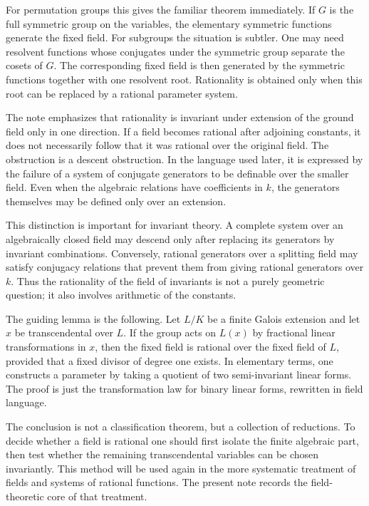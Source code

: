 \documentclass[11pt]{article}
\begin{document}
For permutation groups this gives the familiar theorem immediately. If \(G\) is the full symmetric
group on the variables, the elementary symmetric functions generate the fixed field. For subgroups
the situation is subtler. One may need resolvent functions whose conjugates under the symmetric
group separate the cosets of \(G\). The corresponding fixed field is then generated by the symmetric
functions together with one resolvent root. Rationality is obtained only when this root can be
replaced by a rational parameter system.


The note emphasizes that rationality is invariant under extension of the ground field only in one
direction. If a field becomes rational after adjoining constants, it does not necessarily follow
that it was rational over the original field. The obstruction is a descent obstruction. In the
language used later, it is expressed by the failure of a system of conjugate generators to be
definable over the smaller field. Even when the algebraic relations have coefficients in \(k\), the
generators themselves may be defined only over an extension.


This distinction is important for invariant theory. A complete system over an algebraically closed
field may descend only after replacing its generators by invariant combinations. Conversely,
rational generators over a splitting field may satisfy conjugacy relations that prevent them from
giving rational generators over \(k\). Thus the rationality of the field of invariants is not a
purely geometric question; it also involves arithmetic of the constants.


The guiding lemma is the following. Let \(L/K\) be a finite Galois extension and let \(x\) be
transcendental over \(L\). If the group acts on \(L(x)\) by fractional linear transformations in
\(x\), then the fixed field is rational over the fixed field of \(L\), provided that a fixed divisor
of degree one exists. In elementary terms, one constructs a parameter by taking a quotient of two
semi-invariant linear forms. The proof is just the transformation law for binary linear forms,
rewritten in field language.


The conclusion is not a classification theorem, but a collection of reductions. To decide whether a
field is rational one should first isolate the finite algebraic part, then test whether the
remaining transcendental variables can be chosen invariantly. This method will be used again in the
more systematic treatment of fields and systems of rational functions. The present note records the
field-theoretic core of that treatment.
\end{document}
